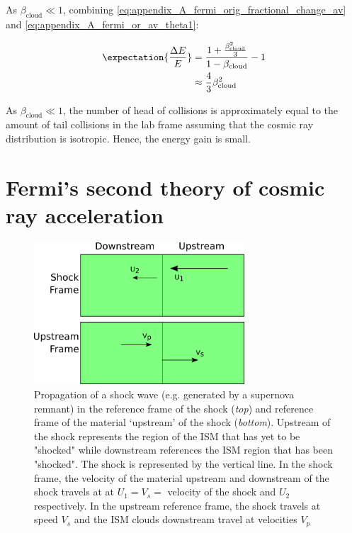 As $\beta_\text{cloud}\ll 1$, combining \autoref{eq:appendix_A_fermi_orig_fractional_change_av} and \autoref{eq:appendix_A_fermi_or_av_theta1}:

\begin{equation}
    \begin{aligned}
    \expectation{\frac{\Delta E}{E}}
	&=\frac{1+\frac{\beta_\text{cloud}^2}{3}}{1-\beta_\text{cloud}}-1 \\
	&\approx\frac{4}{3}\beta_\text{cloud}^2
    \end{aligned} \label{eq:appendix_A_fermi_orig_fractional_change_av_2}
\end{equation}

As $\beta_\text{cloud}\ll 1$, the number of head of collisions is approximately equal to the amount of tail collisions in the lab frame assuming that the cosmic ray distribution is isotropic. Hence, the energy gain is small.

\section{Fermi's second theory of cosmic ray acceleration}

\begin{figure} [h]
	\centering
	\includegraphics[width=0.7\textwidth]{A1_Supernova_Remnants/Images/fermi_second_theory_frames.png}
	\caption{Propagation of a shock wave (e.g. generated by a supernova remnant) in the reference frame of the shock (\textit{top}) and reference frame of the material `upstream' of the shock (\textit{bottom}). Upstream of the shock represents the region of the ISM that has yet to be "shocked" while downstream references the ISM region that has been "shocked". The shock is represented by the vertical line. In the shock frame, the velocity of the material upstream and downstream of the shock travels at at $U_1=V_s=$ velocity of the shock and $U_2$ respectively. In the upstream reference frame, the shock travels at speed $V_s$ and the ISM clouds downstream travel at velocities $V_p$}
	\label{fig:appendix_A_fermi_2nd_frames}
\end{figure}

